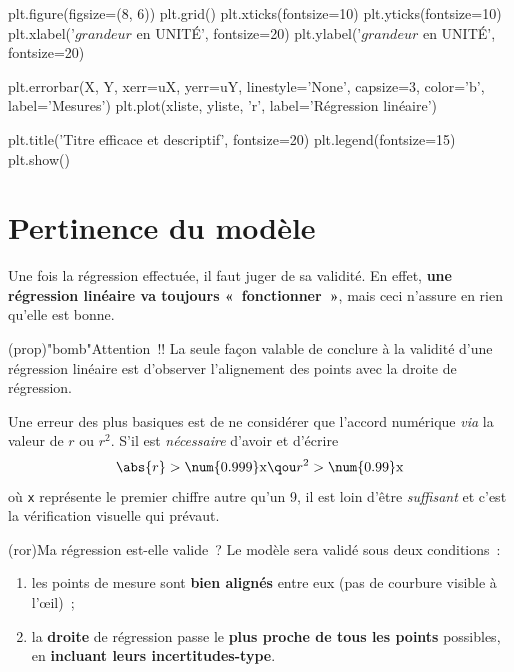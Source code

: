 \documentclass[a4paper, 12pt, garamond]{book}
\begin{document}
\begin{python}
plt.figure(figsize=(8, 6))
plt.grid()
plt.xticks(fontsize=10)
plt.yticks(fontsize=10)
plt.xlabel('$grandeur$ en UNITÉ', fontsize=20)
plt.ylabel('$grandeur$ en UNITÉ', fontsize=20)

plt.errorbar(X, Y,
             xerr=uX, yerr=uY,
             linestyle='None', capsize=3,
             color='b', label='Mesures')
plt.plot(xliste, yliste,
         'r', label='Régression linéaire')

plt.title('Titre efficace et descriptif', fontsize=20)
plt.legend(fontsize=15)
plt.show()
\end{python}

\section{Pertinence du modèle}
Une fois la régression effectuée, il faut juger de sa validité. En effet,
\textbf{une régression linéaire va toujours «~fonctionner~»}, mais ceci n'assure
en rien qu'elle est bonne.

\begin{tcn}(prop)"bomb"{Attention~!!}
	La seule façon valable de conclure à la validité d'une régression linéaire est
	d'observer l'alignement des points avec la droite de régression.
\end{tcn}

Une erreur des plus basiques est de ne considérer que l'accord numérique
\textit{via} la valeur de $r$ ou $r^{2}$. S'il est \textit{nécessaire} d'avoir
et d'écrire
\[
	\abs{r} > \num{0.999}\mathrm{x}
	\qou
	r^{2} > \num{0.99}\mathrm{x}
\]
où \texttt{x} représente le premier chiffre autre qu'un 9, il est loin d'être
\textit{suffisant} et c'est la vérification visuelle qui prévaut.

\begin{tcn}(ror){Ma régression est-elle valide~?}
  Le modèle sera validé sous deux conditions~:
  \begin{enumerate}
    \item les points de mesure sont \textbf{bien alignés} entre eux (pas de
          courbure visible à l'œil)~;
    \item la \textbf{droite} de régression passe le \textbf{plus proche de tous
          les points} possibles, en \textbf{incluant leurs incertitudes-type}.
  \end{enumerate}
\end{tcn}
\end{document}
